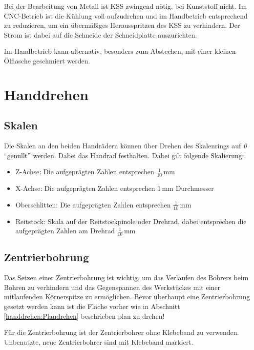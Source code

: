 \documentclass{\basedir/fablab-document}
\begin{document}
Bei der Bearbeitung von Metall ist KSS zwingend nötig, bei Kunststoff nicht.
Im CNC-Betrieb ist die Kühlung voll aufzudrehen und im Handbetrieb entsprechend zu reduzieren,
um ein übermäßiges Herausspritzen des KSS zu verhindern.
Der Strom ist dabei auf die Schneide der Schneidplatte auszurichten.

Im Handbetrieb kann alternativ, besonders zum Abstechen, mit einer kleinen Ölflasche geschmiert werden. 

\newpage
\section{Handdrehen}
\label{handdrehen}
\subsection{Skalen}

Die Skalen an den beiden Handrädern können über Drehen des Skalenrings auf \emph{0} \enquote{genullt} werden.
Dabei das Handrad festhalten.
Dabei gilt folgende Skalierung:
\begin{itemize}
\item Z-Achse: Die aufgeprägten Zahlen entsprechen $\frac{1}{10}$\,mm 
\item X-Achse: Die aufgeprägten Zahlen entsprechen $1$\,mm Durchmesser
\item Oberschlitten: Die aufgeprägten Zahlen entsprechen $\frac{1}{10}$\,mm 
\item Reitstock: Skala auf der Reitstockpinole oder Drehrad, dabei entsprechen die aufgeprägten Zahlen am Drehrad $\frac{1}{10}$\,mm
\end{itemize}


\subsection{Zentrierbohrung}
\label{handdrehen:zentrierbohrung}
Das Setzen einer Zentrierbohrung ist wichtig, um das Verlaufen des Bohrers beim Bohren zu verhindern
und das Gegenspannen des Werkstückes mit einer mitlaufenden Körnerspitze zu ermöglichen.
Bevor überhaupt eine Zentrierbohrung gesetzt werden kann ist die Fläche vorher wie in
Abschnitt \ref{handdrehen:Plandrehen} beschrieben plan zu drehen!


Für die Zentrierbohrung ist der Zentrierbohrer ohne Klebeband zu verwenden.
Unbenutzte, neue Zentrierbohrer sind mit Klebeband markiert.
\end{document}
